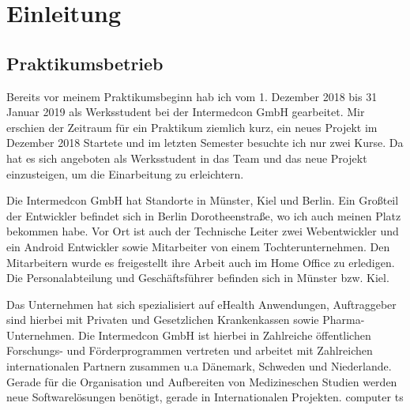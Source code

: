 \chapter{Einleitung}
\section{Praktikumsbetrieb}
Bereits vor meinem Praktikumsbeginn hab ich vom 1. Dezember 2018 bis 31 Januar 2019 als Werksstudent bei der Intermedcon GmbH gearbeitet. Mir erschien der Zeitraum für ein Praktikum ziemlich kurz, ein neues Projekt im Dezember 2018 Startete und  im letzten Semester besuchte ich nur zwei Kurse.  Da hat es sich  angeboten als Werksstudent in das Team und das neue Projekt einzusteigen, um die Einarbeitung zu erleichtern. 

Die Intermedcon GmbH hat Standorte in Münster, Kiel und Berlin. Ein Großteil der Entwickler befindet sich in Berlin Dorotheenstraße, wo ich auch meinen Platz bekommen habe. Vor Ort ist auch der Technische Leiter zwei Webentwickler und ein  Android  Entwickler sowie Mitarbeiter von einem Tochterunternehmen. Den Mitarbeitern wurde es freigestellt ihre Arbeit auch im Home Office zu erledigen. Die Personalabteilung und Geschäftsführer befinden sich in Münster bzw. Kiel. 

Das Unternehmen hat sich spezialisiert auf  eHealth Anwendungen, Auftraggeber sind hierbei mit Privaten und Gesetzlichen Krankenkassen sowie Pharma-Unternehmen. Die Intermedcon GmbH ist hierbei in Zahlreiche öffentlichen Forschungs- und Förderprogrammen vertreten und arbeitet mit Zahlreichen internationalen Partnern zusammen u.a Dänemark, Schweden und Niederlande. Gerade für die Organisation und Aufbereiten von Medizineschen Studien werden neue Softwarelösungen benötigt, gerade in Internationalen Projekten.
\gls{computer}
\ac{ts}



